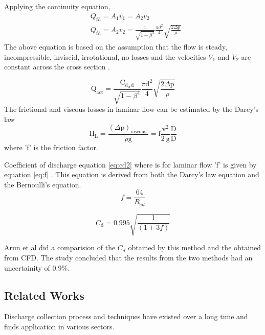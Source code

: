 Applying the continuity equation,
\begin{equation}
\begin{aligned}
&Q_{t h}=A_{1} v_{1}=A_{2} v_{2} \\
&Q_{t h}=A_{2} v_{2}=\frac{1}{\sqrt{1-\beta^{4}}} \frac{\pi d^{2}}{4} \sqrt{\frac{2 \Delta p}{\rho}}
\end{aligned}
\end{equation}
The above equation is based on the assumption that the flow is steady, incompressible, inviscid, irrotational, no losses and the velocities $V_{1}$ and  $V_{2}$ are constant across the cross section \cite{arun2015prediction}. 

\begin{equation}
\mathrm{Q}_{\mathrm{act}}=\frac{\mathrm{C}_{\mathrm{d}_{\mathrm{st}} \mathrm{d}}}{\sqrt{1-\beta^{4}}} \frac{\pi \mathrm{d}^{2}}{4} \sqrt{\frac{2 \Delta \mathrm{p}}{\rho}}
\end{equation}
The frictional and viscous losses in laminar flow can be estimated by the Darcy's law
\begin{equation}
\mathrm{H}_{\mathrm{L}}=\frac{(\Delta \mathrm{p})_{\text {viscous }}}{\rho \mathrm{g}}=\mathrm{f} \frac{\mathrm{v}^{2}}{2 \mathrm{~g}} \frac{\mathrm{D}}{\mathrm{D}}
\end{equation}
where 'f' is the friction factor.
\par
Coefficient of discharge equation \ref{eq:cd2} where is for laminar flow 'f' is given by equation \ref{eq:f} . This equation is derived from both the Darcy's law equation and the Bernoulli's equation.
\begin{equation}
f=\frac{64}{R_{e d}}
\label{eq:f}
\end{equation}


\begin{equation}
C_{\mathrm{d}}=0.995 \sqrt{\frac{1}{(1+3 f)}}
\label{eq:cd2}
\end{equation}

\par
Arun et al \cite{arun2015prediction} did  a comparision of the $C_{d}$ obtained by this method and the obtained from CFD.
The study concluded that the results from the two methods had an uncertainity of $0.9\%$.
\subsection{Related Works}
Discharge collection process and techniques have existed over a long time and finds application in various sectors. 
